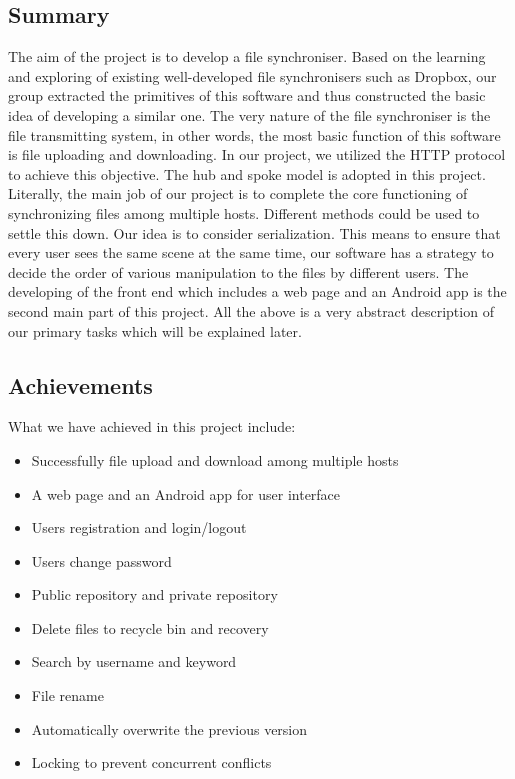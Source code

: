 \documentclass[a4paper,11pt]{article}
\begin{document}
\subsection{Summary} The aim of the project is to develop a file synchroniser. Based on the learning and exploring of existing well-developed file synchronisers such as Dropbox, our group extracted the primitives of this software and thus constructed the basic idea of developing a similar one. The very nature of the file synchroniser is the file transmitting system, in other words, the most basic function of this software is file uploading and downloading. In our project, we utilized the HTTP protocol to achieve this objective. The hub and spoke model is adopted in this project. Literally, the main job of our project is to complete the core functioning of synchronizing files among multiple hosts. Different methods could be used to settle this down. Our idea is to consider serialization. This means to ensure that every user sees the same scene at the same time, our software has a strategy to decide the order of various manipulation to the files by different users. The developing of the front end which includes a web page and an Android app is the second main part of this project. All the above is a very abstract description of our primary tasks which will be explained later.
\subsection{Achievements} 
\par What we have achieved in this project include:
\begin{itemize}

\item Successfully file upload and download among multiple hosts

\item A web page and an Android app for user interface

\item Users registration and login/logout

\item Users change password

\item Public repository and private repository

\item Delete files to recycle bin and recovery

\item Search by username and keyword

\item File rename

\item Automatically overwrite the previous version

\item Locking to prevent concurrent conflicts

\end{itemize}
\end{document}
